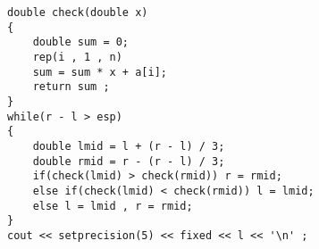 \documentclass[E:/GsjzTle/main/main.tex]{subfiles}
\begin{document}
\begin{lstlisting}
double check(double x)
{
	double sum = 0;
	rep(i , 1 , n)
	sum = sum * x + a[i];
	return sum ;
}
while(r - l > esp)
{
	double lmid = l + (r - l) / 3;
	double rmid = r - (r - l) / 3;
	if(check(lmid) > check(rmid)) r = rmid;
	else if(check(lmid) < check(rmid)) l = lmid;
	else l = lmid , r = rmid;
}
cout << setprecision(5) << fixed << l << '\n' ;
\end{lstlisting}
\end{document}
